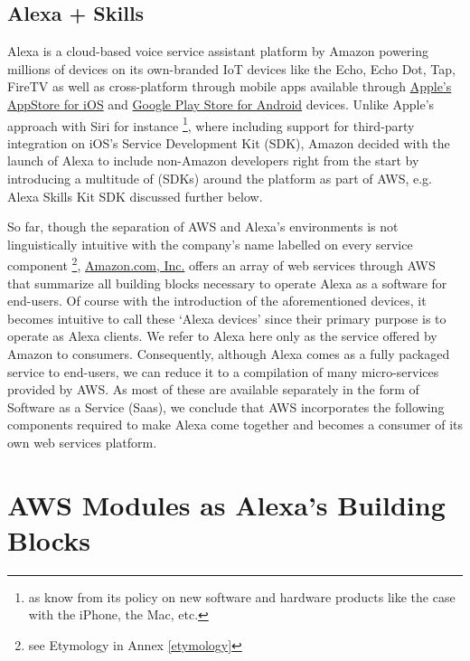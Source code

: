 \subsection*{Alexa + Skills}
\label{alexa:def}
Alexa is a cloud-based voice service assistant platform by Amazon powering millions of devices  on its own-branded IoT devices like the Echo, Echo Dot, Tap, FireTV as well as cross-platform through mobile apps available through  \href{https://itunes.apple.com/de/app/amazon-alexa/id944011620?l=en&mt=8}{Apple's AppStore for iOS} and  \href{https://play.google.com/store/apps/details?id=com.amazon.dee.app&hl=en}{Google Play Store for Android} devices. Unlike Apple's approach with Siri for instance \footnote{as know from its policy on  new software and hardware products like the case with the iPhone, the Mac, etc.}, where including support for third-party integration on iOS's Service Development Kit (SDK), Amazon decided with the launch of Alexa to include non-Amazon developers right from the start by introducing a multitude of (SDKs) around the platform as part of AWS, e.g. Alexa Skills Kit SDK discussed further below.

So far, though the separation of AWS and Alexa's environments is not linguistically intuitive with the company's name labelled on every service component \footnote{see Etymology in Annex \ref{etymology}}, \href{http://www.amazon.com}{Amazon.com, Inc.} offers an array of web services through AWS that summarize all building blocks necessary to operate Alexa as a software for end-users. Of course with the introduction of the aforementioned devices, it becomes intuitive to call these `Alexa devices' since their primary purpose is to operate as Alexa clients. We refer to Alexa here only as the service offered by Amazon to consumers. Consequently, although Alexa comes as a fully packaged service to end-users, we can reduce it to a compilation of many micro-services provided by AWS. As most of these are available separately in the form of Software as a Service (Saas), we conclude that AWS incorporates the following components required to make Alexa come together and becomes a consumer of its own web services platform. 






\section{AWS Modules as Alexa's Building Blocks }
\label{aws:modules}

